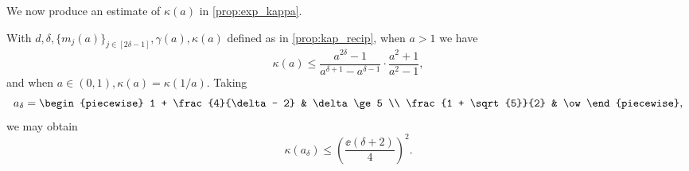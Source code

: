 We now produce an estimate of $\kappa(a)$ in \cref{prop:exp_kappa}.

\begin{proposition}
  With $d, \delta, \{m_j(a)\}_{j \in [2 \delta - 1]}, \gamma(a), \kappa(a)$ defined as in \cref{prop:kap_recip}, when $a > 1$ we have \begin{equation}\kappa(a) \le \dfrac{a^{2 \delta} - 1}{a^{\delta + 1} - a^{\delta - 1}} \cdot \dfrac{a^2 + 1}{a^2 - 1},\label{eq:kap_est}\end{equation} and when $a \in (0, 1), \kappa(a) = \kappa(1 / a)$.  Taking \[a_\delta = \begin{piecewise} 1 + \frac{4}{\delta - 2} & \delta \ge 5 \\ \frac{1 + \sqrt{5}}{2} & \ow \end{piecewise},\] we may obtain \begin{equation} \kappa(a_\delta) \le \left(\dfrac{\ee (\delta + 2)}{4}\right)^2. \label{eq:kap_opt} \end{equation}
  \label{prop:exp_kappa}
\end{proposition}

